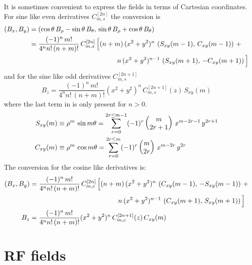 It is sometimes convenient to express the fields in terms of Cartesian coordinates. For sine like
even derivatives $C_{m,s}^{[2n]}$ the conversion is
\begin{align}
  \left( B_x, B_y \right) &= \left( \cos\theta \, B_\rho - \sin\theta \, B_\theta, \,
    \sin\theta \, B_\rho + \cos\theta \, B_\theta \right) \CRNO
  &= \frac{(-1)^n \, m!}{4^n n! \, (n+m)!} \, C_{m,s}^{[2n]} \, \Big[ (n+m) \, (x^2 + y^2)^n \,
    \left( S_{xy}(m-1), \, C_{xy}(m-1) \right) \, + 
    \label{bbtb} \\
  &\hspace{13em}  n \, (x^2 + y^2)^{n-1} \, 
    \left( S_{xy}(m+1), \, -C_{xy}(m+1) \right) \Big] \nonumber
\end{align}
and for the sine like odd derivatives $C_{m,s}^{[2n+1]}$
\begin{equation}
  B_z = \frac{(-1)^n \, m!}{4^n n! \, (n+m)!}
    (x^2 + y^2)^n \, C^{[2n+1]}_{m,s}(z) \, S_{xy}(m)
\end{equation}
where the last term in  is only present for $n > 0$.
\begin{align}
  S_{xy}(m) &\equiv \rho^m \, \sin m\theta = 
    \sum_{r=0}^{2r \le m-1} (-1)^r \begin{pmatrix} m \cr 2r+1 \end{pmatrix} \,
    x^{m-2r-1} \, y^{2r+1} \nonumber \\
  C_{xy}(m) &\equiv \rho^m \, \cos m\theta = 
    \sum_{r=0}^{2r \le m} (-1)^r \begin{pmatrix} m \cr 2r \end{pmatrix} \,
    x^{m-2r} \, y^{2r} 
\end{align}
The conversion for the cosine like derivatives is:
\begin{align}
  \left( B_x, B_y \right) &= 
    \frac{(-1)^n \, m!}{4^n n! \, (n+m)!} \, C_{m,c}^{[2n]} \, \Big[ (n+m) \, (x^2 + y^2)^n \,
    \left( C_{xy}(m-1), \, -S_{xy}(m-1) \right) \, + \CRNO
  &\hspace{13em}  n \, (x^2 + y^2)^{n-1} \, 
    \left( C_{xy}(m+1), \, S_{xy}(m+1) \right) \Big] \\
  B_z &= \frac{(-1)^n \, m!}{4^n n! \, (n+m)!}
    (x^2 + y^2)^n \, C^{[2n+1]}_{m,c}(z) \, C_{xy}(m) \nonumber
\end{align}

\section{RF fields}
\label{s:rf.fields}

